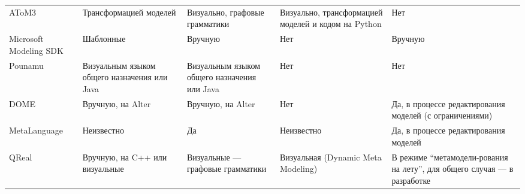 \begin{table}[ht]
\begin{small}
\begin{longtabu} {| X[1 l p] | X[1 l p] | X[1 l p] | X[1 l p] | X[1 l p] |}
		AToM3                        & Трансформацией моделей                        & Визуально, графовые грамматики                 & Визуально, трансформацией моделей и кодом на Python & Нет                                                                        \\
		Microsoft Modeling SDK       & Шаблонные                                     & Вручную                                        & Нет                                                 & Вручную                                                                    \\
		Pounamu                      & Визуальным языком общего назначения или Java  & Визуальным языком общего назначения или Java   & Нет                                                 & Нет                                                                        \\
		DOME                         & Вручную, на Alter                             & Вручную, на Alter                              & Нет                                                 & Да, в процессе редактирования моделей (с ограничениями)                    \\
		MetaLanguage                 & Неизвестно                                    & Да                                             & Неизвестно                                          & Да, в процессе редактирования моделей                                      \\
		 QReal  & Вручную, на C++ или визуальные                & Визуальные --- графовые грамматики             & Визуальная (Dynamic Meta Modeling)                  & В режиме "`метамодели-рования на лету"', для общего случая --- в разработке
		\label{tab:existingPlatformsAdditional}
	\end{longtabu}
\end{small}
\end{table}

